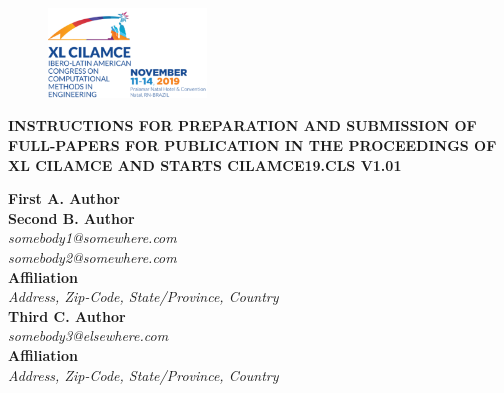 \documentclass{cilamce19}
\begin{document}


 
\begin{titlepage}
	

	
	\begin{figure}
	\flushright
	\includegraphics[width=1.66in]{clm19.png}
    \end{figure}


 \begin{center}
 	\begin{title}
 		\centering
 		\textbf{INSTRUCTIONS FOR PREPARATION AND SUBMISSION OF FULL-PAPERS FOR PUBLICATION IN THE PROCEEDINGS OF XL CILAMCE AND STARTS CILAMCE19.CLS V1.01}
 	\end{title}	
 \end{center}



\textbf{First A. Author}
\\
\textbf{Second B. Author}
\\
\textit{somebody1@somewhere.com}\\
\textit{somebody2@somewhere.com}
\\
\textbf{Affiliation}
\\
\textit{Address, Zip-Code, State/Province, Country}
\\
\textbf{Third C. Author}
\\
\textit{somebody3@elsewhere.com}\\
\textbf{Affiliation}
\\
\textit{Address, Zip-Code, State/Province, Country}
\\


\end{titlepage}
\end{document}
